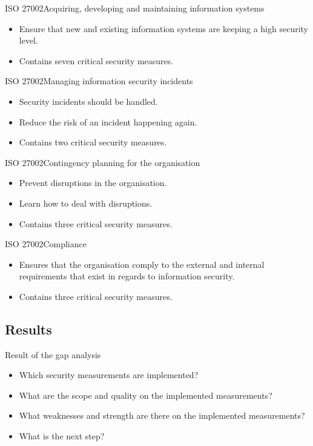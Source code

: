 \documentclass{beamer}
\begin{document}
\begin{frame}{ISO 27002}{Acquiring, developing and maintaining information systems}
  \begin{itemize}
    \item Ensure that new and existing information systems are keeping a high
      security level.
    \item Contains seven critical security measures.
  \end{itemize}
\end{frame}

\begin{frame}{ISO 27002}{Managing information security incidents}
  \begin{itemize}
    \item Security incidents should be handled.
    \item Reduce the risk of an incident happening again.
    \item Contains two critical security measures.
  \end{itemize}
\end{frame}

\begin{frame}{ISO 27002}{Contingency planning for the organisation}
  \begin{itemize}
    \item Prevent disruptions in the organisation.
    \item Learn how to deal with disruptions.
    \item Contains three critical security measures.
  \end{itemize}
\end{frame}

\begin{frame}{ISO 27002}{Compliance}
  \begin{itemize}
    \item Ensures that the organisation comply to the external and internal
      requirements that exist in regards to information security.
    \item Contains three critical security measures.
  \end{itemize}
\end{frame}

\subsection{Results}

\begin{frame}{Result of the gap analysis}
  \begin{itemize}
    \item Which security measurements are implemented?
    \item What are the scope and quality on the implemented measurements?
    \item What weaknesses and strength are there on the implemented
      measurements?
    \item What is the next step\@?
  \end{itemize}
\end{frame}
\end{document}
